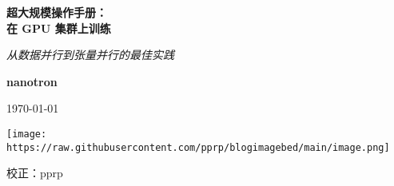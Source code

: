 \documentclass[UTF8]{ctexart}
\begin{document}
\begin{titlepage}

\begin{center}
{\Huge\bfseries 超大规模操作手册：\\[0.5em]
在 GPU 集群上训练\par}
\vspace{2cm}

{\Large\itshape 从数据并行到张量并行的最佳实践\par}
\vspace{1.5cm}

{\large\bfseries nanotron\par}
\vspace{1cm}

{\large\today\par}
\vfill

\texttt{[image: https://raw.githubusercontent.com/pprp/blogimagebed/main/image.png]}
\vfill

{\large 校正：pprp\par}
\end{center}

\end{titlepage}
\end{document}
